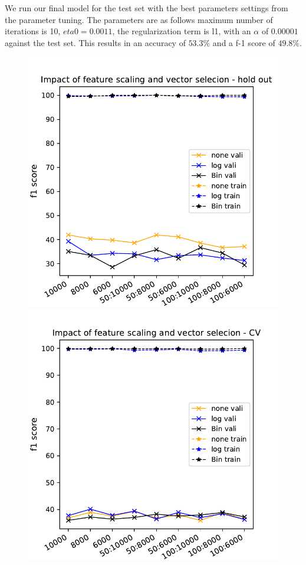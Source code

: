 \documentclass[11pt]{article}
\begin{document}
%
We run our final model for the test set with the best parameters settings from the parameter tuning. The parameters are as follows maximum number of iterations is 10, $eta0=0.0011$, the regularization term is l1, with an $\alpha$ of $0.00001$ against the test set. This results in an accuracy of $53.3\%$ and a f-1 score of $49.8\%$. 
%
\begin{figure}[t]
\begin{minipage}[t]{0.33\textwidth}
\includegraphics[width=1\linewidth]{amazon/RF_scaling_vect_selection_HO.pdf}
\end{minipage}
\begin{minipage}[t]{0.33\textwidth}
\includegraphics[width=1\linewidth]{amazon/RF_scaling_vect_selection_CV.pdf}

\end{minipage}
\end{figure}
\end{document}
